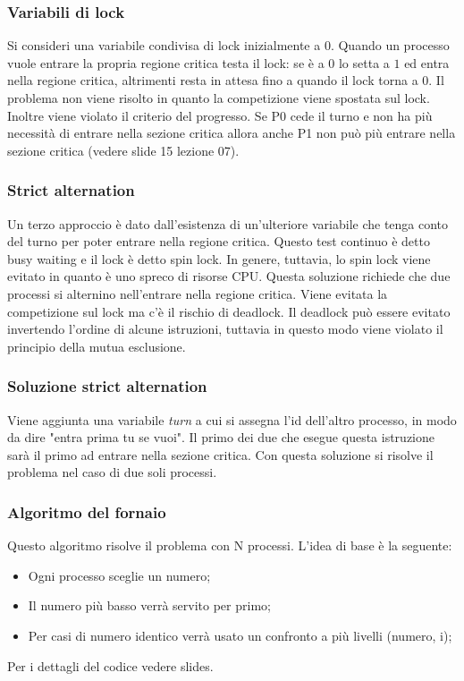 \subsubsection{Variabili di lock}
Si consideri una variabile condivisa di lock inizialmente a $0$. Quando un processo vuole entrare la propria regione critica testa il lock: se è a $0$ lo setta a $1$ ed entra nella
regione critica, altrimenti resta in attesa fino a quando il lock torna a $0$. Il problema non viene risolto in quanto la competizione viene spostata sul lock.
Inoltre viene violato il criterio del progresso. Se P0 cede il turno e non ha più necessità di entrare nella sezione critica allora anche P1 non può più entrare nella sezione critica (vedere slide 15 lezione 07).

\subsubsection{Strict alternation}
Un terzo approccio è dato dall'esistenza di un'ulteriore variabile che tenga conto del turno per poter entrare nella regione critica. Questo test continuo è detto busy waiting e il
lock è detto spin lock. In genere, tuttavia, lo spin lock viene evitato in quanto è uno spreco di risorse CPU. Questa soluzione richiede che due processi si alternino nell'entrare nella regione critica.
Viene evitata la competizione sul lock ma c'è il rischio di deadlock. Il deadlock può essere evitato invertendo l'ordine di alcune istruzioni, tuttavia in questo modo viene violato il principio della mutua esclusione.

\subsubsection{Soluzione strict alternation}
Viene aggiunta una variabile \emph{turn} a cui si assegna l'id dell'altro processo, in modo da dire "entra prima tu se vuoi". Il primo dei due che esegue questa istruzione sarà il primo ad entrare nella sezione critica. Con questa soluzione si risolve il problema nel caso di due soli processi.

\subsubsection{Algoritmo del fornaio}
Questo algoritmo risolve il problema con N processi. L'idea di base è la seguente:
\begin{itemize}
	\item Ogni processo sceglie un numero;
	\item Il numero più basso verrà servito per primo;
	\item Per casi di numero identico verrà usato un confronto a più livelli (numero, i);
\end{itemize}
Per i dettagli del codice vedere slides.

